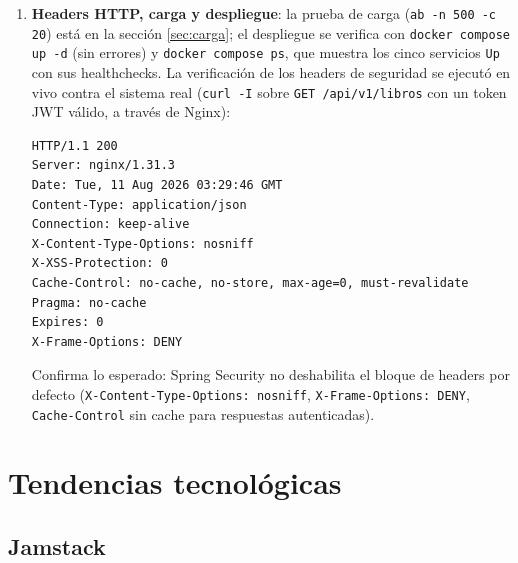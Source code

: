 \documentclass[12pt,a4paper]{article}
\begin{document}
\begin{enumerate}[label=\textbf{Paso \arabic*.}, itemsep=2pt]
        \texttt{LibroDetalle}), que muestra \texttt{tituloOpenLibrary},
        \texttt{coverUrl}, \texttt{numeroPaginas} y \texttt{descripcionOpenLibrary} con
        \texttt{?? 'No disponible'} como valor de respaldo en cada campo, y un
        placeholder ("Portada no disponible.") cuando \texttt{coverUrl} es
        \texttt{null} — de modo que la página nunca se rompe si Open Library no
        responde o el ISBN no existe ahí. Verificado en vivo para ambos casos: el
        libro con ISBN de "1984" (con datos) y "Cien años de soledad" (sin datos),
        ninguno de los dos produjo errores de JavaScript en el navegador.
  \item \textbf{Headers HTTP, carga y despliegue}: la prueba de carga
        (\texttt{ab -n 500 -c 20}) está en la sección \ref{sec:carga}; el despliegue se
        verifica con \texttt{docker compose up -d} (sin errores) y \texttt{docker compose
        ps}, que muestra los cinco servicios \texttt{Up} con sus healthchecks. La
        verificación de los headers de seguridad se ejecutó en vivo contra el sistema
        real (\texttt{curl -I} sobre \texttt{GET /api/v1/libros} con un token JWT
        válido, a través de Nginx):
\begin{lstlisting}[basicstyle=\ttfamily\footnotesize, caption={Headers HTTP reales devueltos por el sistema (\texttt{curl -I}, 11 de agosto de 2026).}]
HTTP/1.1 200
Server: nginx/1.31.3
Date: Tue, 11 Aug 2026 03:29:46 GMT
Content-Type: application/json
Connection: keep-alive
X-Content-Type-Options: nosniff
X-XSS-Protection: 0
Cache-Control: no-cache, no-store, max-age=0, must-revalidate
Pragma: no-cache
Expires: 0
X-Frame-Options: DENY
\end{lstlisting}
        Confirma lo esperado: Spring Security no deshabilita el bloque de headers por
        defecto (\texttt{X-Content-Type-Options: nosniff}, \texttt{X-Frame-Options:
        DENY}, \texttt{Cache-Control} sin cache para respuestas autenticadas).
\end{enumerate}

\newpage

\section{Tendencias tecnológicas}

\subsection{Jamstack}
\end{document}

